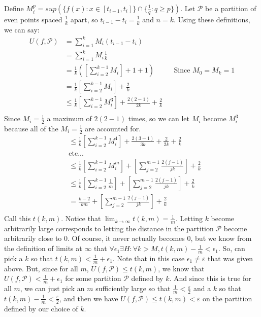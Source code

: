 \documentclass{article}
\begin{document}
Define $M_{i}^{p} = sup(\{f(x):x\in[t_{i-1}, t_{i}]\} \cap \{\frac{1}{q}:q\geq p\})$. Let $\mathcal{P}$ be a partition of even points spaced $\frac{1}{k}$ apart, so $t_{i-1} - t_{i} = \frac{1}{k}$ and $n = k$.  Using these definitions, we can say:
\begin{align*}
	U(f, \mathcal{P}) &= \sum_{i=1}^{k} M_{i} (t_{i-1} - t_{i})\\
	&=  \sum_{i=1}^{k} M_{i} \frac{1}{k}\\
	&=  \frac{1}{k}\left(\left[\sum_{i=2}^{k-1} M_{i}\right] + 1 + 1\right) &&\text{Since $M_{0} = M_{k} = 1$}\\ 
	&=\frac{1}{k}\left[\sum_{i=2}^{k-1} M_{i}\right] + \frac{2}{k}\\
	&\leq \frac{1}{k}\left[\sum_{i=2}^{k-1} M_{i}^{3}\right] +\frac{2(2-1)}{2k} + \frac{2}{k}\\
\end{align*}
Since $M_{i} = \frac{1}{2}$ a maximum of $2(2-1)$ times, so we can let $M_{i}$ become $M_{i}^3$ because all of the $M_{i} = \frac{1}{2}$ are accounted for.
\begin{align*}
	&\leq \frac{1}{k}\left[\sum_{i=2}^{k-1} M_{i}^{4}\right] +\frac{2(3-1)}{3k} +\frac{2}{2k} + \frac{2}{k}\\
	&\text{etc...}\\
	&\leq \frac{1}{k}\left[\sum_{i=2}^{k-1} M_{i}^{m}\right] +\left[\sum_{j=2}^{m-1} \frac{2(j-1)}{jk}\right] + \frac{2}{k}\\
	&\leq \frac{1}{k}\left[\sum_{i=2}^{k-1} \frac{1}{m}\right] +\left[\sum_{j=2}^{m-1} \frac{2(j-1)}{jk}\right] + \frac{2}{k}\\
	&= \frac{k-2}{km}+\left[\sum_{j=2}^{m-1} \frac{2(j-1)}{jk}\right] + \frac{2}{k}\\
\end{align*}
Call this $t(k, m)$. Notice that $\lim_{k\to \infty} t(k, m) = \frac{1}{m}$. Letting $k$   become arbitrarily large corresponds to letting the distance in the partition $\mathcal{P}$ become arbitrarily close to 0. Of course, it never actually becomes 0, but we know from the definition of limits at $\infty$ that $\forall \epsilon_{1} \exists H: \forall k > M, t(k, m) - \frac{1}{m} < \epsilon_{1}$. So, can pick a $k$ so that $t(k, m) < \frac{1}{m} +\epsilon_{1}$. Note that in this case $\epsilon_{1} \neq \varepsilon$ that was given above. But, since for all $m$, $U(f, \mathcal{P}) \leq t(k, m)$, we know that $U(f, \mathcal{P}) < \frac{1}{m} +\epsilon_{1}$ for some partition $\mathcal{P}$ defined by $k$. And since this is true for all $m$, we can just pick an $m$ sufficiently large so that $\frac{1}{m} < \frac{\varepsilon}{2}$ and a $k$ so that $t(k, m) - \frac{1}{m} < \frac{\varepsilon}{2}$, and then we have $U(f, \mathcal{P}) \leq t(k, m) < \varepsilon$ on the partition defined by our choice of $k$.
\end{document}
